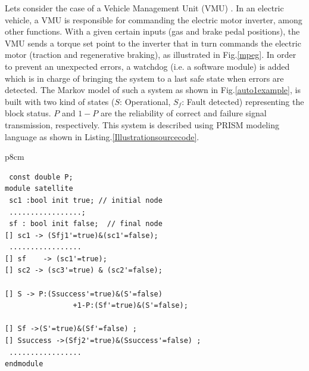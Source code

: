 \documentclass[3p,times,procedia,authoryear,round]{elsarticle}
\begin{document}
Lets consider the case of a Vehicle Management Unit (VMU) \citep{Cherfi201442}. In an electric vehicle, a VMU is responsible for commanding the electric motor inverter, among other functions. With a given certain inputs (gas and brake pedal positions), the VMU sends a torque set point to the inverter that in turn commands the electric motor (traction and regenerative braking), as illustrated in Fig.\ref{mpeg}. In order to prevent an unexpected errors, a watchdog (i.e. a software module) is added which is in charge of bringing the system to a last safe state when errors are detected. The Markov model of such a system as shown in Fig.\ref{auto1example}, is built with two kind of states ($S$: Operational, $S_{f}$: Fault detected) representing the block status. $P$ and $1-P$ are the reliability of correct and failure signal transmission, respectively. This system is described using PRISM modeling language as shown in Listing.\ref{Illustrationsourcecode}.


        \footnotesize 
        
        \begin{table}[!ht]
         	\begin{center}
            
            
 \begin{tabular}{ p{8cm} }
 \begin{lstlisting}
 const double P;
module satellite
 sc1 :bool init true; // initial node
 .................;
 sf : bool init false;  // final node      
[] sc1 -> (Sfj1'=true)&(sc1'=false);
 .................
[] sf    -> (sc1'=true);
[] sc2 -> (sc3'=true) & (sc2'=false);

[] S -> P:(Ssuccess'=true)&(S'=false)
                +1-P:(Sf'=true)&(S'=false);
               
[] Sf ->(S'=true)&(Sf'=false) ;
[] Ssuccess ->(Sfj2'=true)&(Ssuccess'=false) ;   
 .................
endmodule     
 \end{lstlisting} 	
                
                
                \\
                
                
            \end{tabular}
            
            	\end{center}
        \end{table}
        \normalsize
        
\end{document}
